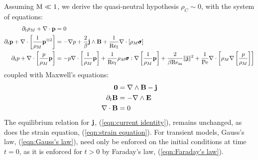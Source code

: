     Assuming $\mathrm{M}  \ll  1$, we derive the quasi-neutral hypothesis $\rho_{C}  \sim  0$, with the system of equations:
    {\small \begin{align}
        \partial_{t}\rho_{M} + \nabla\cdot\mathbf{p}  &=  0  \label{eqn:mass conservation} 
         \\
        \partial_{t}\mathbf{p} + \nabla\cdot\left[\frac{1}{\rho_{M}}\mathbf{p}^{\otimes 2}\right]  &=  - \nabla p + \frac{2}{\beta}\mathbf{j}\wedge\mathbf{B} + \frac{1}{\mathrm{Re}_{\mathrm{f}}}\nabla\cdot[\rho_{M}\pmb{\mathsf{\sigma}}]  \label{eqn:momentum conservation}  \\
        \partial_{t}p + \nabla\cdot\left[\frac{p}{\rho_{M}}\mathbf{p}\right]  &=  - p\nabla\cdot\left[\frac{1}{\rho_{M}}\mathbf{p}\right] + \frac{1}{\mathrm{Re}_{\mathrm{f}}}\rho_{M}\pmb{\mathsf{\sigma}}:\nabla\left[\frac{1}{\rho_{M}}\mathbf{p}\right] + \frac{2}{\beta\mathrm{Re}_{\mathrm{m}}}\|\mathbf{j}\|^{2} + \frac{1}{\mathrm{Pe}}\nabla\cdot\left[\rho_{M}\nabla\left[\frac{p}{\rho_{M}}\right]\right]  \label{eqn:energy conservation}
    \end{align}}
    coupled with Maxwell's equations:
    \begin{align}
        \mathbf{0}  &=  \nabla\wedge\mathbf{B} - \mathbf{j}  \label{eqn:Ampère's law}  \\
        \partial_{t}\mathbf{B}  &=  - \nabla\wedge\mathbf{E}  \label{eqn:Faraday's law}  \\
        \nabla\cdot\mathbf{B}  &=  0  \label{eqn:Gauss's law}
    \end{align}
    The equilibrium relation for $\mathbf{j}$, (\ref{eqn:current identity}), remains unchanged, as does the strain equation, (\ref{eqn:strain equation}). For transient models, Gauss's law, (\ref{eqn:Gauss's law}), need only be enforced on the initial conditions at time $t  =  0$, as it is enforced for $t  >  0$ by Faraday's law, (\ref{eqn:Faraday's law}).

